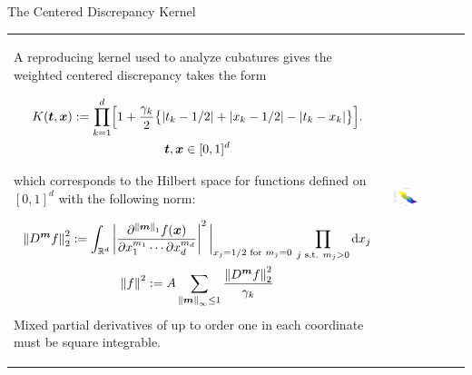 \documentclass[10pt,compress,xcolor={usenames,dvipsnames},aspectratio=169]{beamer}
\begin{document}
\begin{frame}{The Centered Discrepancy Kernel \cite{Hic97a}}
	\vspace{-2ex}
	\begin{tabular}{m{}m{}}
	A reproducing kernel used to analyze cubatures gives the weighted centered discrepancy takes the form
	
	\vspace{-4ex}
	\begin{multline*}
	K(\vt,\vx) : = \prod_{k=1}^d \Bigl[ 1 + \frac {\gamma_k}2 \bigl\{ \abs{t_k - 1/2} + \abs{x_k -1/2} - \abs{t_k-x_k} \bigr\} \Bigr]. \\
	 \vt, \vx \in [0,1]^d
	\end{multline*}

\vspace{-2ex}
which corresponds to the Hilbert space for functions defined on $[0,1]^d$ with the following norm:

	\vspace{-4ex}
		\begin{gather*}
			\norm[2]{D^{\vm} f}^2 := \int_{\reals^d} \abs{\frac{\partial^{\norm[1]{\vm}}f(\vx)}{\partial x_1^{m_1} \cdots \partial x_d^{m_d}}}^2 \bigg \rvert_{x_j = 1/2 \text{ for } m_j = 0} \, \prod_{j \text{ s.t. } m_j > 0} \dif x_j  \\
			\norm{f}^2 : = A \sum_{\norm[\infty]{\vm} \le 1} \frac{\norm[2]{D^{\vm} f}^2}{\gamma_k}
		\end{gather*}
	Mixed partial derivatives of up to order one in each coordinate must be square integrable.
	&
		\includegraphics[width=0.38\textwidth]{RK2-ctrdiscker.eps}
		\end{tabular}
\end{frame}
\end{document}
